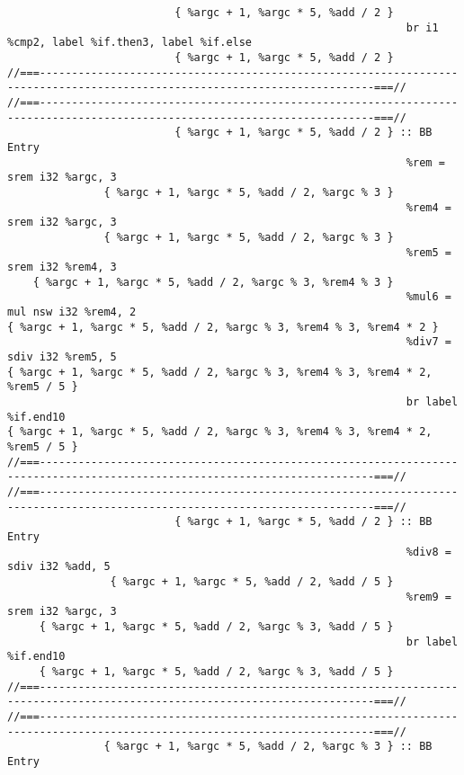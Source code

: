 \begin{verbatim}
                          { %argc + 1, %argc * 5, %add / 2 }
                                                              br i1 %cmp2, label %if.then3, label %if.else
                          { %argc + 1, %argc * 5, %add / 2 }
//===--------------------------------------------------------------------------------------------------------------------------===//
//===--------------------------------------------------------------------------------------------------------------------------===//
                          { %argc + 1, %argc * 5, %add / 2 } :: BB Entry
                                                              %rem = srem i32 %argc, 3
               { %argc + 1, %argc * 5, %add / 2, %argc % 3 }
                                                              %rem4 = srem i32 %argc, 3
               { %argc + 1, %argc * 5, %add / 2, %argc % 3 }
                                                              %rem5 = srem i32 %rem4, 3
    { %argc + 1, %argc * 5, %add / 2, %argc % 3, %rem4 % 3 }
                                                              %mul6 = mul nsw i32 %rem4, 2
{ %argc + 1, %argc * 5, %add / 2, %argc % 3, %rem4 % 3, %rem4 * 2 }
                                                              %div7 = sdiv i32 %rem5, 5
{ %argc + 1, %argc * 5, %add / 2, %argc % 3, %rem4 % 3, %rem4 * 2, %rem5 / 5 }
                                                              br label %if.end10
{ %argc + 1, %argc * 5, %add / 2, %argc % 3, %rem4 % 3, %rem4 * 2, %rem5 / 5 }
//===--------------------------------------------------------------------------------------------------------------------------===//
//===--------------------------------------------------------------------------------------------------------------------------===//
                          { %argc + 1, %argc * 5, %add / 2 } :: BB Entry
                                                              %div8 = sdiv i32 %add, 5
                { %argc + 1, %argc * 5, %add / 2, %add / 5 }
                                                              %rem9 = srem i32 %argc, 3
     { %argc + 1, %argc * 5, %add / 2, %argc % 3, %add / 5 }
                                                              br label %if.end10
     { %argc + 1, %argc * 5, %add / 2, %argc % 3, %add / 5 }
//===--------------------------------------------------------------------------------------------------------------------------===//
//===--------------------------------------------------------------------------------------------------------------------------===//
               { %argc + 1, %argc * 5, %add / 2, %argc % 3 } :: BB Entry

\end{verbatim}
